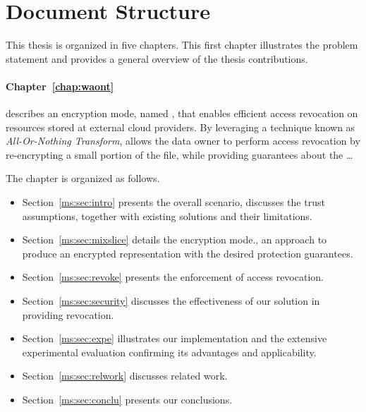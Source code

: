 \lipsum[1]

\medskip

\section{Document Structure}

This thesis is organized in five chapters. This first chapter illustrates the problem statement and provides a general overview of the thesis contributions.

\paragraph*{Chapter~\ref{chap:waont}}
describes an encryption mode, named \name, that enables efficient access revocation on resources stored at external cloud providers. By leveraging a technique known as {\em All-Or-Nothing Transform}, \name allows the data owner to perform access revocation by re-encrypting a small portion of the file, while providing guarantees about the \ldots

\smallskip

The chapter is organized as follows.

\begin{itemize}
	\item Section~\ref{ms:sec:intro} presents the overall scenario, discusses the trust assumptions, together with existing solutions and their limitations.
	
	\item Section~\ref{ms:sec:mixslice} details the \name encryption mode., an approach to produce an encrypted representation with the desired protection guarantees.
	\item Section~\ref{ms:sec:revoke} presents the enforcement of access revocation. 
	
	\item Section~\ref{ms:sec:security} discusses the effectiveness of our solution in providing revocation.
	
	\item Section~\ref{ms:sec:expe} illustrates our implementation and the extensive experimental evaluation confirming its advantages and applicability. 
	
	\item Section~\ref{ms:sec:relwork} discusses related work. 
	
	\item Section~\ref{ms:sec:conclu} presents our conclusions.
\end{itemize}

